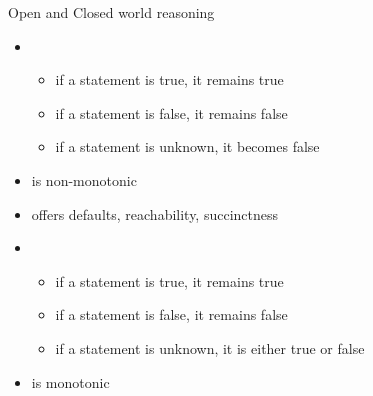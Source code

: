 \begin{frame}{Open and Closed world reasoning}
  \begin{itemize}
  \item<1-> 
    \begin{itemize}
    \item if a statement is true, it remains true
    \item if a statement is false, it remains false
    \item if a statement is unknown, it becomes false
    \end{itemize}
  \item<3->[] is non-monotonic
  \item<4->[] offers defaults, reachability, succinctness
    \medskip
  \item<2-> 
    \begin{itemize}
    \item if a statement is true, it remains true
    \item if a statement is false, it remains false
    \item if a statement is unknown, it is either true or false
    \end{itemize}
  \item<3->[] is monotonic
\end{itemize}
\end{frame}
